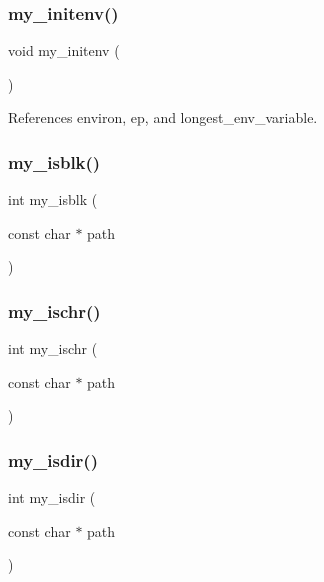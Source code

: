 \subsubsection{\texorpdfstring{my\+\_\+initenv()}{my\_initenv()}}
{\footnotesize\ttfamily void my\+\_\+initenv (\begin{DoxyParamCaption}{ }\end{DoxyParamCaption})}



References environ, ep, and longest\+\_\+env\+\_\+variable.

\mbox{\label{C-M__system_8c_ad07b549d969a0670b0b8f7c6bef83e92}} 
\subsubsection{\texorpdfstring{my\+\_\+isblk()}{my\_isblk()}}
{\footnotesize\ttfamily int my\+\_\+isblk (\begin{DoxyParamCaption}\item[{const char $\ast$}]{path }\end{DoxyParamCaption})}

\mbox{\label{C-M__system_8c_ae59ec13b3517e84ddd30a0cd5352a01d}} 
\subsubsection{\texorpdfstring{my\+\_\+ischr()}{my\_ischr()}}
{\footnotesize\ttfamily int my\+\_\+ischr (\begin{DoxyParamCaption}\item[{const char $\ast$}]{path }\end{DoxyParamCaption})}

\mbox{\label{C-M__system_8c_a4d9118bb9590e12ac1956789cd08e09b}} 
\subsubsection{\texorpdfstring{my\+\_\+isdir()}{my\_isdir()}}
{\footnotesize\ttfamily int my\+\_\+isdir (\begin{DoxyParamCaption}\item[{const char $\ast$}]{path }\end{DoxyParamCaption})}

